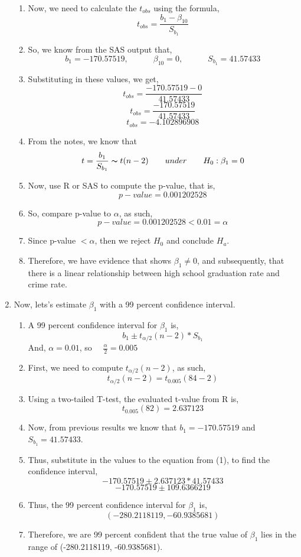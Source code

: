 \documentclass{article}
\begin{document}
\begin{enumerate}[label = \alph*)]
\begin{enumerate}[label = \arabic*)]
			\item Now, we need to calculate the $t_{obs}$ using the formula,
			\[t_{obs} = \frac{b_1 - \beta_{10}}{S_{b_1}}\]
			\item So, we know from the SAS output that,
			\[b_1 = -170.57519, \quad \qquad \beta_{10} = 0, \quad \qquad S_{b_1} = 41.57433\]
			\item Substituting in these values, we get,
			\[t_{obs} = \frac{-170.57519 - 0}{41.57433}\]
			\[t_{obs} = \frac{-170.57519}{41.57433}\]
			\[t_{obs} = -4.102896908\]
			\item From the notes, we know that 
			\[t = \frac{b_1}{S_{b_1}} \thicksim t(n-2) \qquad  under \qquad H_0: \beta_1 = 0\]
			\item Now, use R or SAS to compute the p-value, that is,
			\[p-value = 0.001202528\]
			\item So, compare p-value to $\alpha$, as such,
			\[p-value = 0.001202528 < 0.01 = \alpha\]
			\item Since p-value $< \alpha$, then we reject $H_0$ and conclude $H_a$.
			\item Therefore, we have evidence that shows $\beta_1 \neq 0$, and subsequently, that there is a linear relationship between high school graduation rate and crime rate.
		\end{enumerate}
		\item Now, lets's estimate $\beta_1$ with a 99 percent confidence interval.
		\begin{enumerate}[label = \arabic*)]
			\item A 99 percent confidence interval for $\beta_1$ is,
			\[b_1 \pm t_{\alpha/2}(n-2) * S_{b_1}\]
			And, $\alpha = 0.01$, so $\quad \frac{\alpha}{2} = 0.005$
			\item First, we need to compute $t_{\alpha/2}(n-2)$, as such,
			\[t_{\alpha/2}(n-2) = t_{0.005}(84-2)\]
			\item Using a two-tailed T-test, the evaluated t-value from R is,
			\[t_{0.005}(82) = 2.637123\]
			\item Now, from previous results we know that $b_1 = -170.57519$ and $S_{b_1} = 41.57433$.
			\item Thus, substitute in the values to the equation from (1), to find the confidence interval,
			\[-170.57519 \pm 2.637123 * 41.57433\]
			\[-170.57519 \pm 109.6366219\]
			\item Thus, the 99 percent confidence interval for $\beta_1$ is,
			\[(-280.2118119, -60.9385681)\]
			\item Therefore, we are 99 percent confident that the true value of $\beta_1$ lies in the range of (-280.2118119, -60.9385681).
		\end{enumerate}
	\end{enumerate}
\end{document}
